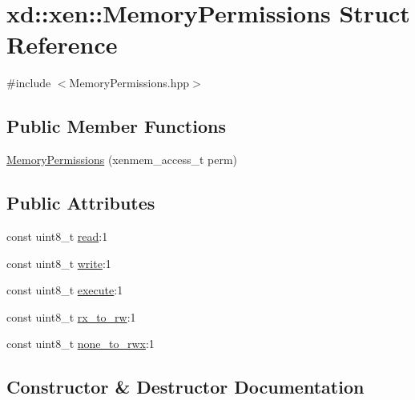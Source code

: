 \hypertarget{structxd_1_1xen_1_1_memory_permissions}{}\section{xd\+:\+:xen\+:\+:Memory\+Permissions Struct Reference}
\label{structxd_1_1xen_1_1_memory_permissions}


{\ttfamily \#include $<$Memory\+Permissions.\+hpp$>$}

\subsection*{Public Member Functions}
\begin{DoxyCompactItemize}
\item 
\mbox{\hyperlink{structxd_1_1xen_1_1_memory_permissions_a0aeb52febf023c9a3d0c362c4443df4c}{Memory\+Permissions}} (xenmem\+\_\+access\+\_\+t perm)
\end{DoxyCompactItemize}
\subsection*{Public Attributes}
\begin{DoxyCompactItemize}
\item 
const uint8\+\_\+t \mbox{\hyperlink{structxd_1_1xen_1_1_memory_permissions_a8ca8b09452dffa1cac4765a0dc787c64}{read}}\+:1
\item 
const uint8\+\_\+t \mbox{\hyperlink{structxd_1_1xen_1_1_memory_permissions_a7fb66430d91836c5d24f031fa67b0914}{write}}\+:1
\item 
const uint8\+\_\+t \mbox{\hyperlink{structxd_1_1xen_1_1_memory_permissions_a9d5332694c12ef6f1d11c0c02788e651}{execute}}\+:1
\item 
const uint8\+\_\+t \mbox{\hyperlink{structxd_1_1xen_1_1_memory_permissions_aa5d67546efda0e4ddb6cfa9b662ff5b1}{rx\+\_\+to\+\_\+rw}}\+:1
\item 
const uint8\+\_\+t \mbox{\hyperlink{structxd_1_1xen_1_1_memory_permissions_a9ff5e224a6b7daef7a589729d624b4f1}{none\+\_\+to\+\_\+rwx}}\+:1
\end{DoxyCompactItemize}


\subsection{Constructor \& Destructor Documentation}
\mbox{\label{structxd_1_1xen_1_1_memory_permissions_a0aeb52febf023c9a3d0c362c4443df4c}} 
